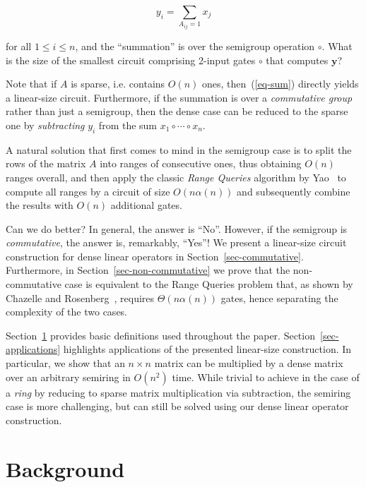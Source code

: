 \documentclass[11pt,letterpaper]{article}
\begin{document}
\begin{equation}\label{eq-sum}
y_i = \sum_{A_{ij}=1} x_j
\end{equation}

\noindent
for all $1 \le i \le n$, and the ``summation'' is over the semigroup operation
$\circ$. What is the size of the smallest circuit comprising 2-input gates
$\circ$ that computes $\mathbf{y}$?

Note that if $A$ is sparse, i.e. contains $O(n)$ ones, then~(\ref{eq-sum})
directly yields a linear-size circuit. Furthermore, if the summation is over a
\emph{commutative group} rather than just a semigroup, then the dense case can
be reduced to the sparse one by \emph{subtracting} $y_i$ from the sum
$x_1 \circ \cdots \circ x_n$.

A natural solution that first comes to mind in the semigroup case is to split
the rows of the matrix $A$ into ranges of consecutive ones, thus obtaining
$O(n)$ ranges overall, and then apply the classic \emph{Range Queries} algorithm
by Yao~\cite{DBLP:conf/stoc/Yao82} to compute all ranges by a circuit of size
$O(n\alpha(n))$ and subsequently combine the results with $O(n)$ additional
gates.

Can we do better? In general, the answer is ``No''. However, if the semigroup is
\emph{commutative}, the answer is, remarkably, ``Yes''! We present a linear-size
circuit construction for dense linear operators in Section~\ref{sec-commutative}.
Furthermore, in Section~\ref{sec-non-commutative} we prove that the
non-commutative case is equivalent to the Range Queries problem that, as shown
by Chazelle and Rosenberg~\cite{DBLP:journals/ijcga/ChazelleR91}, requires
$\Theta(n\alpha(n))$ gates, hence separating the complexity of the two cases.

Section~\ref{sec-background} provides basic definitions used throughout the
paper. Section~\ref{sec-applications} highlights applications of the
presented linear-size construction. In particular, we show that an $n\times n$
matrix can be multiplied by a dense matrix over an arbitrary semiring in
$O(n^2)$ time. While trivial to achieve in the case of a \emph{ring} by reducing
to sparse matrix multiplication via subtraction, the semiring case is more
challenging, but can still be solved using our dense linear operator
construction.

\section{Background}\label{sec-background}
\end{document}

